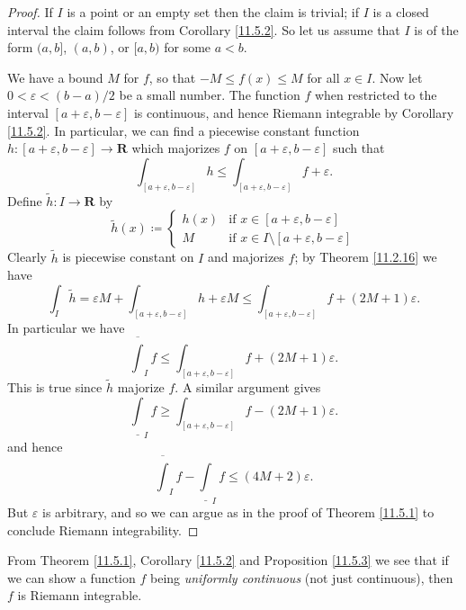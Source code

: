 \begin{proof}
    If \(I\) is a point or an empty set then the claim is trivial;
    if \(I\) is a closed interval the claim follows from Corollary \ref{11.5.2}.
    So let us assume that \(I\) is of the form \((a, b]\), \((a, b)\), or \([a, b)\) for some \(a < b\).

    We have a bound \(M\) for \(f\), so that \(-M \leq f(x) \leq M\) for all \(x \in I\).
    Now let \(0 < \varepsilon < (b - a) / 2\) be a small number.
    The function \(f\) when restricted to the interval \([a + \varepsilon, b - \varepsilon]\) is continuous, and hence Riemann integrable by Corollary \ref{11.5.2}.
    In particular, we can find a piecewise constant function \(h : [a + \varepsilon, b - \varepsilon] \to \mathbf{R}\) which majorizes \(f\) on \([a + \varepsilon, b - \varepsilon]\) such that
    \[
        \int_{[a + \varepsilon, b - \varepsilon]} h \leq \int_{[a + \varepsilon, b - \varepsilon]} f + \varepsilon.
    \]
    Define \(\tilde{h} : I \to \mathbf{R}\) by
    \[
        \tilde{h}(x) \coloneqq \begin{cases}
            h(x) & \text{if } x \in [a + \varepsilon, b - \varepsilon]             \\
            M    & \text{if } x \in I \setminus [a + \varepsilon, b - \varepsilon]
        \end{cases}
    \]
    Clearly \(\tilde{h}\) is piecewise constant on \(I\) and majorizes \(f\);
    by Theorem \ref{11.2.16} we have
    \[
        \int_I \tilde{h} = \varepsilon M + \int_{[a + \varepsilon, b - \varepsilon]} h + \varepsilon M \leq \int_{[a + \varepsilon, b - \varepsilon]} f + (2M + 1) \varepsilon.
    \]
    In particular we have
    \[
        \overline{\int}_I f \leq \int_{[a + \varepsilon, b - \varepsilon]} f + (2M + 1) \varepsilon.
    \]
    This is true since \(\tilde{h}\) majorize \(f\).
    A similar argument gives
    \[
        \underline{\int}_I f \geq \int_{[a + \varepsilon, b - \varepsilon]} f - (2M + 1) \varepsilon.
    \]
    and hence
    \[
        \overline{\int}_I f - \underline{\int}_I f \leq (4M + 2) \varepsilon.
    \]
    But \(\varepsilon\) is arbitrary, and so we can argue as in the proof of Theorem \ref{11.5.1} to conclude Riemann integrability.
\end{proof}

\begin{note}
    From Theorem \ref{11.5.1}, Corollary \ref{11.5.2} and Proposition \ref{11.5.3} we see that if we can show a function \(f\) being \emph{uniformly continuous} (not just continuous), then \(f\) is Riemann integrable.
\end{note}

